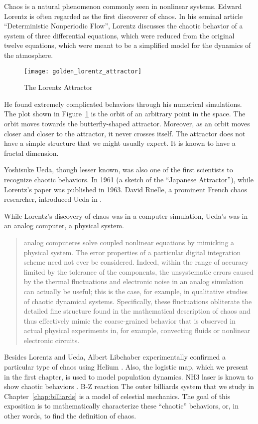 \documentclass[10pt,twoside,draft]{book}
\begin{document}
Chaos is a natural phenomenon commonly seen in nonlinear systems.
Edward Lorentz is often regarded as the first discoverer of chaos.
In his seminal article ``Deterministic Nonperiodic Flow'', Lorentz discusses the chaotic behavior of a system of three differential equations, which were reduced from the original twelve equations, which were meant to be a simplified model for the dynamics of the atmosphere.
\begin{figure}[ht]
  \centering
  \texttt{[image: golden\_lorentz\_attractor]}
  \caption{The Lorentz Attractor}
  \label{fig:lorentz}
\end{figure}
He found extremely complicated behaviors through his numerical simulations.
The plot shown in Figure~\ref{fig:lorentz} is the orbit of an arbitrary point in the space.
The orbit moves towards the butterfly-shaped attractor.
Moreover, as an orbit moves closer and closer to the attractor, it never crosses itself.
The attractor does not have a simple structure that we might usually expect.
It is known to have a fractal dimension.

Yoshisuke Ueda, though lesser known, was also one of the first scientists to recognize chaotic behaviors.
In 1961 (a sketch of the ``Japanese Attractor''), while Lorentz's paper was published in 1963.
David Ruelle, a prominent French chaos researcher, introduced Ueda in \citep{ruelle}.

While Lorentz's discovery of chaos was in a computer simulation, Ueda's was in an analog computer, a physical system.
\citet[p.383]{campbell}
\begin{quotation}
  analog computeres solve coupled nonlinear equations by mimicking a physical system.
  The error properties of a particular digital integration scheme need not ever be considered.
  Indeed, within the range of accuracy limited by the tolerance of the components, the unsystematic errors caused by the thermal fluctuations and electronic noise in an analog simulation can actually be useful; this is the case, for example, in qualitative studies of chaotic dynamical systems.
  Specifically, these fluctuations obliterate the detailed fine structure found in the mathematical description of chaos and thus effectively mimic the coarse-grained behavior that is observed in actual physical experiments in, for example, convecting fluids or nonlinear electronic circuits.
\end{quotation}
Besides Lorentz and Ueda, Albert Libchaber experimentally confirmed a particular type of chaos using Helium \citep{gleick}.
Also, the logistic map, which we present in the first chapter, is used to model population dynamics.
NH3 laser is known to show chaotic behaviors \citep{kantz-schreiber}.
B-Z reaction
The outer billiards system that we study in Chapter~\ref{chap:billiards} is a model of celestial mechanics.
The goal of this exposition is to mathematically characterize these ``chaotic'' behaviors, or, in other words, to find the definition of chaos.
\end{document}
